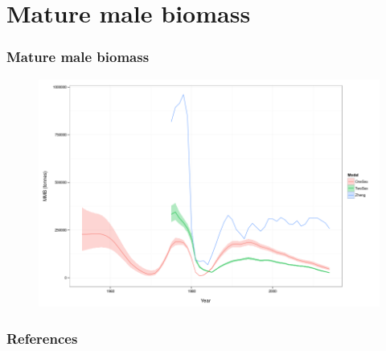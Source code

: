 \documentclass{beamer}
\begin{document}

\section{Mature male biomass}


\begin{frame}
\frametitle{Mature male biomass}
\begin{figure}[!htbp]
  \centering
  \includegraphics[width=0.6\linewidth]{figure/spawning_stock_biomass-1.png}
\end{figure}
\end{frame}


\begin{frame}
\frametitle{References}


\end{frame}

\end{document}
